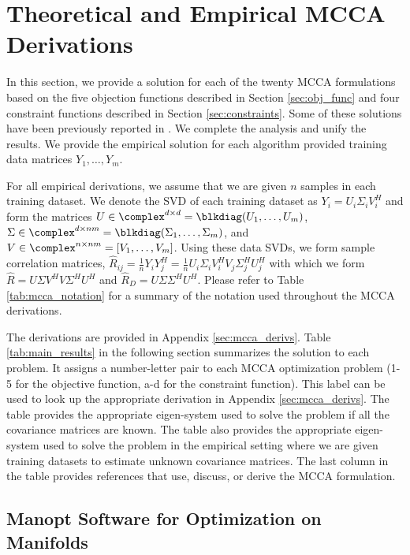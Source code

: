 \section{Theoretical and Empirical MCCA Derivations}

In this section, we provide a solution for each of the twenty MCCA formulations based on
the five objection functions described in Section \ref{sec:obj_func} and four constraint
functions described in Section \ref{sec:constraints}. Some of these solutions have been
previously reported in \cite{kettenring1971canonical, nielsen1994analysis}. We complete
the analysis and unify the results. We provide the empirical solution for each algorithm
provided training data matrices $Y_1,\dots, Y_m$.

For all empirical derivations, we assume that we are given $n$ samples in each training
dataset. We denote the SVD of each training dataset as $Y_i=U_i\Sigma_iV_i^H$ and form the
matrices $U\in\complex^{d\times d}=\blkdiag(U_1,\dots,U_m)$, $\Sigma\in\complex^{d\times
  nm}=\blkdiag(\Sigma_1,\dots,\Sigma_m)$, and $V\in\complex^{n\times nm}=[V_1,\dots,V_m]$.
Using these data SVDs, we form sample correlation matrices,
$\widehat{R}_{ij}=\frac{1}{n}Y_iY_j^H = \frac{1}{n}U_i\Sigma_iV_i^HV_j\Sigma_j^HU_j^H$
with which we form $\widehat{R}=U\Sigma V^HV\Sigma^HU^H$ and
$\widehat{R}_D=U\Sigma\Sigma^HU^H$. Please refer to Table \ref{tab:mcca_notation} for a
summary of the notation used throughout the MCCA derivations.

The derivations are provided in Appendix \ref{sec:mcca_derivs}. Table
\ref{tab:main_results} in the following section summarizes the solution to each
problem. It assigns a number-letter pair to each MCCA optimization problem (1-5 for the
objective function, a-d for the constraint function). This label can be used to look up
the appropriate derivation in Appendix \ref{sec:mcca_derivs}. The table provides the
appropriate eigen-system used to solve the problem if all the covariance matrices are
known. The table also provides the appropriate eigen-system used to solve the problem in
the empirical setting where we are given training datasets to estimate unknown covariance
matrices. The last column in the table provides references that use, discuss, or derive
the MCCA formulation.

\subsection{Manopt Software for Optimization on Manifolds}


